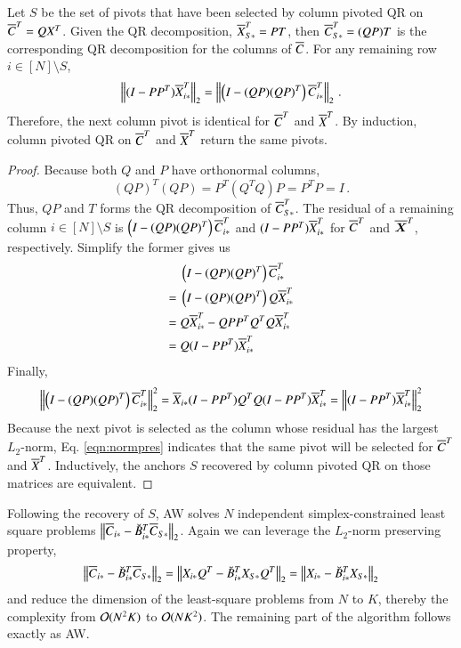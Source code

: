 \begin{lemma}\label{lem:qrequiv}
  Let $S$ be the set of pivots that have been selected by column pivoted QR on
  $\overline{C}^T = QX^T$. Given the QR decomposition, $\overline{X}_{S\ast}^T = PT$, then
  $\overline{C}_{S\ast}^T = (QP)T$ is the corresponding QR decomposition for the
  columns of $\overline{C}$. For any remaining row $i\in [N]\setminus S$,
  \begin{equation}
  	\left\lVert(I-PP^T)\overline{X}_{i\ast}^T\right\rVert_2 = \left\lVert\left(I-(QP)(QP)^T\right)\overline{C}_
  	{i\ast}^T\right\rVert_2\,.
  \end{equation}
  Therefore, the next column pivot is identical for $\overline{C}^T$ and $\overline{X}^T$. 
  By induction, column pivoted QR on $\overline{C}^T$ and $\overline{X}^T$ return the same
  pivots.
\end{lemma}
\begingroup
\allowdisplaybreaks
\begin{proof}
  Because both $Q$ and $P$ have orthonormal columns,
  \begin{equation}
    (QP)^T(QP) = P^T(Q^TQ)P = P^TP = I\,.
  \end{equation}
  Thus, $QP$ and $T$ forms the QR decomposition of $\overline{C}_{S\ast}^T$. The
  residual of a remaining column $i\in[N]\setminus S$ is $\left(I-(QP)
  (QP)^T\right) \overline{C}_{i\ast}^T$ and $(I-PP^T)\overline{X}_{i\ast}^T$ for $\overline{C}^T$ and
  $\overline{\bm{X}}^T$, respectively. Simplify the former gives us
  \begin{align*}
    &\left(I-(QP)(QP)^T\right)\overline{C}_{i\ast}^T \\
    ={} & \left(I-(QP)(QP)^T\right)Q\overline{X}_{i\ast}^T \\
    ={} & Q\overline{X}_{i\ast}^T - QPP^TQ^TQ\overline{X}_{i\ast}^T\\
    ={} & Q(I-PP^T)\overline{X}_{i\ast}^T
  \end{align*}
  Finally,
  \begin{equation}\label{eqn:normpres}
    \left\lVert\left(I-(QP)(QP)^T\right)\overline{C}_{i\ast}^T\right\rVert_2^2 = \overline{X}_{i\ast} 
    (I-PP^T)Q^TQ (I-PP^T)\overline{X}_{i\ast}^T = \left\lVert(I-PP^T)\overline{X}_{i\ast}^T\right\rVert_2^2
  \end{equation}
  Because the next pivot is selected as the column whose residual has the
  largest $L_2$\hyp{}norm, Eq. \ref{eqn:normpres} indicates that the same pivot
  will be selected for $\overline{C}^T$ and $\overline{X}^T$. Inductively, the anchors $S$
  recovered by column pivoted QR on those matrices are equivalent.
\end{proof}
\endgroup

Following the recovery of $S$, AW solves $N$ independent 
simplex\hyp{}constrained least square problems $\left\lVert\overline{C}_{i\ast} - \breve{B}_
{i\ast}^T\overline{C}_{S\ast}\right\rVert_2$. Again we can leverage the $L_2$\hyp{}norm preserving
property, 
\begin{equation}\label{eqn:lrls}
  \left\lVert\overline{C}_{i\ast} - \breve{B}_{i\ast}^T\overline{C}_{S\ast}\right\rVert_2 = \left\lVert X_{i\ast}Q^T
  - \breve{B}_{i\ast}^TX_{S\ast}Q^T\right\rVert_2 = \left\lVert X_{i\ast} - \breve{B}_{i\ast}^T X_
  {S\ast}\right\rVert_2
\end{equation}
and reduce the dimension of the least\hyp{}square problems from $N$ to $K$,
thereby the complexity from $\mathcal{O}(N^2K)$ to $\mathcal{O}(NK^2)$. The remaining part
of the algorithm follows exactly as AW.

